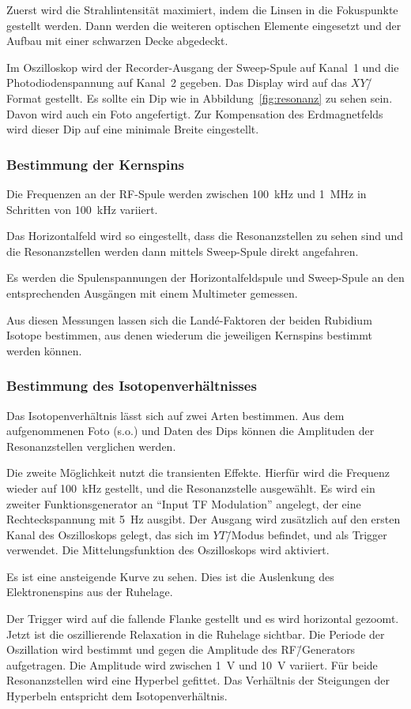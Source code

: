 Zuerst wird die Strahlintensität maximiert, indem die Linsen in die Fokuspunkte
gestellt werden.
Dann werden die weiteren optischen Elemente eingesetzt und der Aufbau mit einer
schwarzen Decke abgedeckt.

Im Oszilloskop wird der Recorder-Ausgang der Sweep-Spule auf Kanal~1 und die
Photodiodenspannung auf Kanal~2 gegeben.
Das Display wird auf das $XY$\=/Format gestellt.
Es sollte ein Dip wie in Abbildung~\ref{fig:resonanz} zu sehen sein.
Davon wird auch ein Foto angefertigt.
Zur Kompensation des Erdmagnetfelds wird dieser Dip auf eine minimale Breite
eingestellt.


\subsubsection{Bestimmung der Kernspins}%
\label{sub:bestimmung_der_kernspins}

Die Frequenzen an der RF-Spule werden zwischen \SI{100}{\kilo\hertz} und
\SI{1}{\mega\hertz} in Schritten von \SI{100}{\kilo\hertz} variiert.

Das Horizontalfeld wird so eingestellt, dass die Resonanzstellen zu sehen sind
und
die Resonanzstellen werden dann mittels Sweep-Spule direkt angefahren.

Es werden die Spulenspannungen der Horizontalfeldspule und Sweep-Spule
an den entsprechenden Ausgängen mit einem Multimeter gemessen.

Aus diesen Messungen lassen sich die Land\'e-Faktoren der beiden Rubidium
Isotope bestimmen, aus denen wiederum die jeweiligen Kernspins bestimmt werden
können.

\subsubsection{Bestimmung des Isotopenverhältnisses}%
\label{sub:bestimmung_des_isotopenverhaltnisses}

Das Isotopenverhältnis lässt sich auf zwei Arten bestimmen.
Aus dem aufgenommenen Foto (s.o.) und Daten des Dips können die
Amplituden der Resonanzstellen verglichen werden.

Die zweite Möglichkeit nutzt die transienten Effekte.
Hierfür wird die Frequenz wieder auf \SI{100}{\kilo\hertz} gestellt,
und die Resonanzstelle ausgewählt.
Es wird ein zweiter Funktionsgenerator an \enquote{Input TF Modulation}
angelegt, der eine Rechteckspannung mit \SI{5}{\hertz} ausgibt.
Der Ausgang wird zusätzlich auf den ersten Kanal des Oszilloskops gelegt, das
sich im $YT$\=/Modus befindet, und als Trigger verwendet.
Die Mittelungsfunktion des Oszilloskops wird aktiviert.

Es ist eine ansteigende Kurve zu sehen.
Dies ist die Auslenkung des Elektronenspins aus der Ruhelage.

Der Trigger wird auf die fallende Flanke gestellt und es wird horizontal
gezoomt.
Jetzt ist die oszillierende Relaxation in die Ruhelage sichtbar.
Die Periode der Oszillation wird bestimmt und gegen die Amplitude des
RF\=/Generators aufgetragen.
Die Amplitude wird zwischen \SI{1}{\volt} und \SI{10}{\volt} variiert.
Für beide Resonanzstellen wird eine Hyperbel gefittet.
Das Verhältnis der Steigungen der Hyperbeln entspricht dem Isotopenverhältnis.
